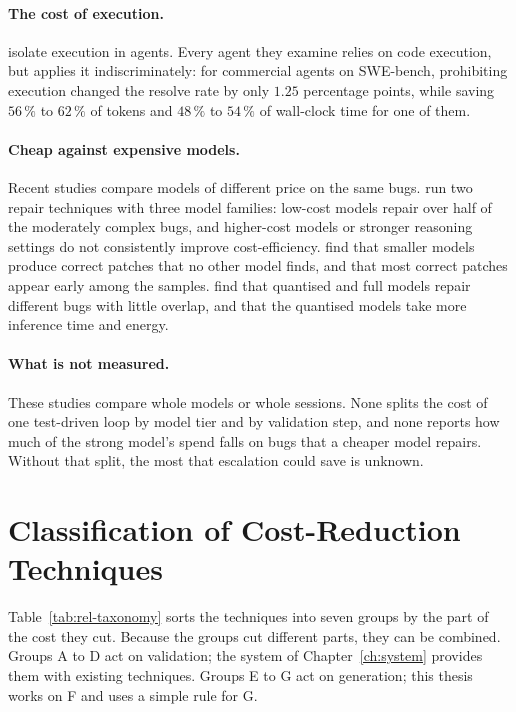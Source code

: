 \paragraph{The cost of execution.} \citet{lin2026torun} isolate execution in
agents. Every agent they examine relies on code execution, but applies it
indiscriminately: for commercial agents on SWE-bench, prohibiting execution
changed the resolve rate by only $1.25$ percentage points, while saving
$56\,\%$ to $62\,\%$ of tokens and $48\,\%$ to $54\,\%$ of wall-clock time for
one of them.

\paragraph{Cheap against expensive models.} Recent studies compare models of
different price on the same bugs. \citet{liu2026rethinking} run two repair
techniques with three model families: low-cost models repair over half of the
moderately complex bugs, and higher-cost models or stronger reasoning settings
do not consistently improve cost-efficiency. \citet{sun2025empirical} find that
smaller models produce correct patches that no other model finds, and that
most correct patches appear early among the samples.
\citet{vallecillos2026quantization} find that quantised and full models repair
different bugs with little overlap, and that the quantised models take more
inference time and energy.

\paragraph{What is not measured.} These studies compare whole models or whole
sessions. None splits the cost of one test-driven loop by model tier and by
validation step, and none reports how much of the strong model's spend falls
on bugs that a cheaper model repairs. Without that split, the most that
escalation could save is unknown.

\section{Classification of Cost-Reduction Techniques}
\label{sec:rel-taxonomy}

Table~\ref{tab:rel-taxonomy} sorts the techniques into seven groups by the part
of the cost they cut. Because the groups cut different parts, they can be
combined. Groups A to D act on validation; the system of
Chapter~\ref{ch:system} provides them with existing techniques. Groups E to G
act on generation; this thesis works on F and uses a simple rule for G.

